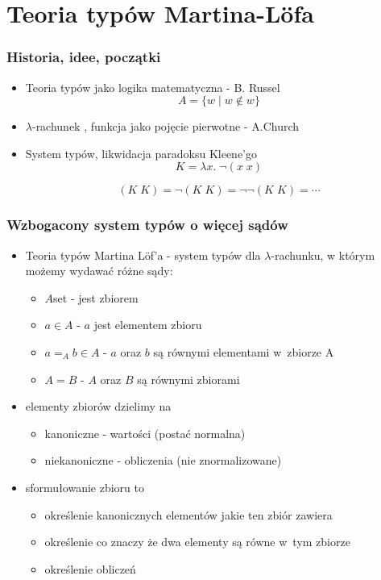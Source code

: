 \documentclass{beamer}
\begin{document}

\section{Teoria typów Martina-L\"{o}fa}

\begin{frame}
\frametitle{Historia, idee, początki}

\begin{itemize}
 \item Teoria typów jako logika matematyczna - B. Russel
 \[
  A = \{ w \mid w \not\in w \}
 \]
 \item $\lambda$-rachunek , funkcja jako pojęcie pierwotne  - A.Church
 \item System typów, likwidacja paradoksu Kleene'go
\[
 K = \lambda x.\; \neg (x\; x)
\]

\[
 (K\; K) = \neg (K\; K) = \neg \neg (K\; K) = \cdots
\]

\end{itemize}


\end{frame}


\begin{frame}
\frametitle{Wzbogacony system typów o więcej sądów}

\begin{itemize}
 \item Teoria typów Martina L\"{o}f'a - system typów dla $\lambda$-rachunku, w którym możemy wydawać różne sądy:
       
\begin{itemize}
 \item $A$\;set -  jest zbiorem
 \item $a \in A$ - $a$ jest elementem zbioru
 \item $a =_A b \in A$ - $a$ oraz $b$ są równymi elementami w~zbiorze A
 \item $A = B$ - $A$ oraz $B$ są równymi zbiorami
\end{itemize}

\item elementy zbiorów dzielimy na
\begin{itemize}
 \item kanoniczne - wartości (postać normalna)
 \item niekanoniczne - obliczenia (nie znormalizowane)
\end{itemize}


\item sformułowanie zbioru to
\begin{itemize}
 \item określenie kanonicznych elementów jakie ten zbiór zawiera
 \item określenie co znaczy że dwa elementy są równe w~tym zbiorze
 \item określenie obliczeń
\end{itemize}

\end{itemize}


\end{frame}
\end{document}
